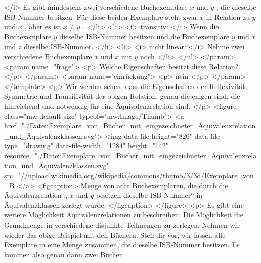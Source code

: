       </i>
      Es gibt mindestens zwei verschiedene Buchexemplare
      $x$
      und
      $y$
      , die dieselbe ISB-Nummer besitzen. Für diese beiden Exemplare steht zwar
      $x$
      in Relation zu
      $y$
      und
      $x$
      , aber es ist
      $x\ne y$
      .
     </li>
     <li>
      <i>
       transitiv:
      </i>
      Wenn die Buchexemplare
      $y$
      dieselbe ISB-Nummer besitzen und die Buchexemplare
      $y$
      und
      $x$
      und
      $z$
      dieselbe ISB-Nummer.
     </li>
     <li>
      <i>
       nicht linear:
      </i>
      Nehme zwei verschiedene Buchexemplare
      $x$
      und
      $x$
      mit
      $y$
      noch
     </li>
    </ul>
   </param>
   <param name="frage">
    <p>
     Welche Eigenschaften besitzt diese Relation?
    </p>
   </param>
   <param name="einrückung">
    <p>
     nein
    </p>
   </param>
  </template>
  <p>
   Wir werden sehen, dass die Eigenschaften der Reflexivität, Symmetrie und Transitivität der obigen Relation, genau diejenigen sind, die hinreichend und notwendig für eine Äquivalenzrelation sind.
  </p>
  <figure class="mw-default-size" typeof="mw:Image/Thumb">
   <a href="./Datei:Exemplare_von_Bücher_mit_eingezeichneter_Äquivalenzrelation_und_Äquivalenzklassen.svg">
    <img data-file-height="826" data-file-type="drawing" data-file-width="1284" height="142" resource="./Datei:Exemplare_von_Bücher_mit_eingezeichneter_Äquivalenzrelation_und_Äquivalenzklassen.svg" src="//upload.wikimedia.org/wikipedia/commons/thumb/3/3d/Exemplare_von_B%
   </a>
   <figcaption>
    Menge von acht Buchexemplaren, die durch die Äquivalenzrelation „
    $x$
    und
    $y$
    besitzen dieselbe ISB-Nummer“ in Äquivalenzklassen zerlegt wurde.
   </figcaption>
  </figure>
  <p>
   Es gibt eine weitere Möglichkeit Äquivalenzrelationen zu beschreiben: Die Möglichkeit die Grundmenge in verschiedene disjunkte Teilmengen zu zerlegen. Nehmen wir wieder das obige Beispiel mit den Büchern. Stell dir vor, wir fassen alle Exemplare in eine Menge zusammen, die dieselbe ISB-Nummer besitzen. Es kommen also genau dann zwei Bücher
